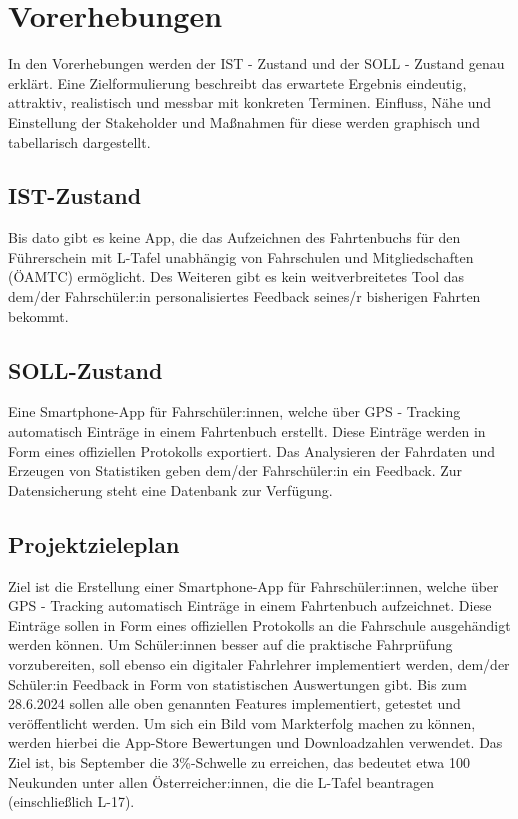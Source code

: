 \section{Vorerhebungen}
In den Vorerhebungen werden der IST - Zustand und der SOLL - Zustand genau erklärt. Eine Zielformulierung beschreibt das erwartete Ergebnis eindeutig, attraktiv, realistisch und messbar mit konkreten Terminen. Einfluss, Nähe und Einstellung der Stakeholder und Maßnahmen für diese werden graphisch und tabellarisch dargestellt.

\subsection{IST-Zustand}
Bis dato gibt es keine App, die das Aufzeichnen des Fahrtenbuchs für den Führerschein mit L-Tafel unabhängig von Fahrschulen und Mitgliedschaften (ÖAMTC) ermöglicht. Des Weiteren gibt es kein weitverbreitetes Tool das dem/der Fahrschüler:in personalisiertes Feedback seines/r bisherigen Fahrten bekommt.

\subsection{SOLL-Zustand}
Eine Smartphone-App für Fahrschüler:innen, welche über GPS - Tracking automatisch Einträge in einem Fahrtenbuch erstellt. Diese Einträge werden in Form eines offiziellen Protokolls exportiert. Das Analysieren der Fahrdaten und Erzeugen von Statistiken geben dem/der Fahrschüler:in ein Feedback. Zur Datensicherung steht eine Datenbank zur Verfügung.

\subsection{Projektzieleplan}
Ziel ist die Erstellung einer Smartphone-App für Fahrschüler:innen, welche über GPS - Tracking automatisch Einträge in einem Fahrtenbuch aufzeichnet. Diese Einträge sollen in Form eines offiziellen Protokolls an die Fahrschule ausgehändigt werden können. Um Schüler:innen besser auf die praktische Fahrprüfung vorzubereiten, soll ebenso ein digitaler Fahrlehrer implementiert werden, dem/der Schüler:in Feedback in Form von statistischen Auswertungen gibt. Bis zum 28.6.2024 sollen alle oben genannten Features implementiert, getestet und veröffentlicht werden. Um sich ein Bild vom Markterfolg machen zu können, werden hierbei die App-Store Bewertungen und Downloadzahlen verwendet. Das Ziel ist, bis September die 3\%-Schwelle zu erreichen, das bedeutet etwa 100 Neukunden unter allen Österreicher:innen, die die L-Tafel beantragen (einschließlich L-17).

